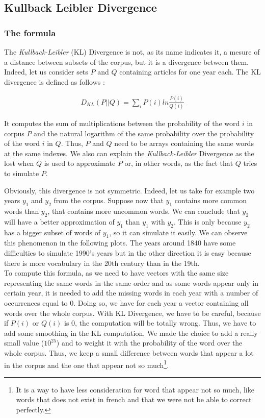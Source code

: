 \subsection{Kullback Leibler Divergence}

\subsubsection{The formula}
The \emph{Kullback-Leibler} (KL) Divergence is not, as its name indicates it, a mesure of a distance between subsets of the corpus, but it is a divergence between them. Indeed, let us consider sets $P$ and $Q$ containing articles for one year each. The KL divergence is defined as follows :

\begin{eqnarray}\label{KL}
    D_{KL}(P||Q) = \sum_i P(i) ln \frac{P(i)}{Q(i)}
\end{eqnarray}

It computes the sum of multiplications between the probability of the word $i$ in corpus $P$ and the natural logarithm of the same probability over the probability of the word $i$ in $Q$. Thus, $P$ and $Q$ need to be arrays containing the same words at the same indexes. We also can explain the \emph{Kullback-Leibler} Divergence as the lost when $Q$ is used to approximate $P$ or, in other words, as the fact that $Q$ tries to simulate $P$.

Obviously, this divergence is not symmetric. Indeed, let us take for example two years $y_1$ and $y_2$ from the corpus. Suppose now that $y_1$ contains more common words than $y_2$, that contains more uncommon words. We can conclude that $y_2$ will have a better approximation of $y_1$ than $y_1$ with $y_2$. This is only because $y_2$ has a bigger subset of words of $y_1$, so it can simulate it easily. We can observe this phenomenon in the following plots. The years around 1840 have some difficulties to simulate 1990's years but in the other direction it is easy because there is more vocabulary in the 20th century than in the 19th.\\

To compute this formula, as we need to have vectors with the same size representing the same words in the same order and as some words appear only in certain year, it is needed to add the missing words in each year with a number of occurrences equal to 0. Doing so, we have for each year a vector containing all words over the whole corpus. With KL Divergence, we have to be careful, because if $P(i)$ or $Q(i)$ is 0, the computation will be totally wrong. Thus, we have to add some smoothing in the KL computation. We made the choice to add a really small value ($10^{25}$) and to weight it with the probability of the word over the whole corpus. Thus, we keep a small difference between words that appear a lot in the corpus and the one that appear not so much\footnote{It is a way to have less consideration for word that appear not so much, like words that does not exist in french and that we were not be able to correct perfectly.}.

